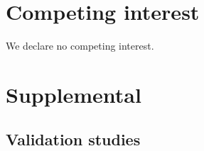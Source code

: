 \section*{Competing interest}
\noindent
We declare no competing interest. 




\clearpage
\beginsupplement
\section{Supplemental} \label{Supplemental_text}

\subsection{Validation studies}

